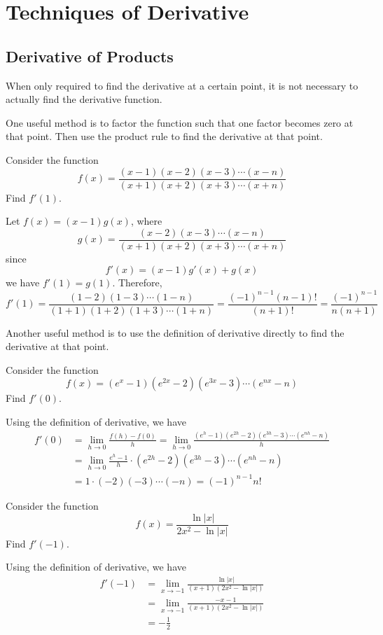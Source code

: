 \documentclass{overview}
\begin{document}
\section{Techniques of Derivative}
\subsection{Derivative of Products}

When only required to find the derivative at a certain point, it is not necessary
to actually find the derivative function.

One useful method is to factor the function such that one factor becomes zero at that point.
Then use the product rule to find the derivative at that point.
\begin{example}
	Consider the function
	\[
		f(x) = \frac{(x-1)(x-2)(x-3)\cdots(x-n)}{(x+1)(x+2)(x+3)\cdots(x+n)}
	\] 
	Find $f'(1)$.
	\begin{answer}
		Let $f(x) = (x-1)g(x)$, where
		\[
			g(x) = \frac{(x-2)(x-3)\cdots(x-n)}{(x+1)(x+2)(x+3)\cdots(x+n)}
		\]
		since
		\[
			f'(x) = (x-1)g'(x) + g(x)
		\] 
		we have $f'(1) = g(1)$. Therefore,
		\[
			f'(1) = \frac{(1-2)(1-3)\cdots(1-n)}{(1+1)(1+2)(1+3)\cdots(1+n)} =
			\frac{(-1)^{n-1}(n-1)!}{(n+1)!} = \frac{(-1)^{n-1}}{n(n+1)}
		\]
	\end{answer}
\end{example}

Another useful method is to use the definition of derivative directly to
find the derivative at that point.
\begin{example}
	Consider the function
	\[
		f(x) = (e^{x}-1)(e^{2x}-2)(e^{3x}-3)\cdots(e^{nx}-n)
	\]
	Find $f'(0)$.
	\begin{answer}
		Using the definition of derivative, we have
		\[
		\begin{aligned}
			f'(0) &= \lim_{h \to 0} \frac{f(h) - f(0)}{h} =
			\lim_{h \to 0} \frac{(e^{h}-1)(e^{2h}-2)(e^{3h}-3)\cdots(e^{nh}-n)}{h} \\
						&= \lim_{h \to 0} \frac{e^{h}-1}{h}\cdot (e^{2h}-2)(e^{3h}-3)\cdots(e^{nh}-n) \\
						&= 1 \cdot (-2)(-3)\cdots(-n) = (-1)^{n-1} n!
		\end{aligned}
	\]
	\end{answer}
\end{example}

\begin{example}
	Consider the function
	\[
		f(x) = \frac{\ln|x|}{2x^2-\ln|x|}
	\]
	Find $f'(-1)$.
	\begin{answer}
		Using the definition of derivative, we have
		\[
		\begin{aligned}
			f'(-1) &= \lim_{x \to -1} \frac{\ln|x|}{(x+1)(2x^2 - \ln|x|)} \\
					&= \lim_{x \to -1} \frac{-x-1}{(x+1)(2x^2 - \ln|x|)} \\
					&= -\frac{1}{2}
		\end{aligned}
		\]
	\end{answer}
\end{example}
\end{document}
